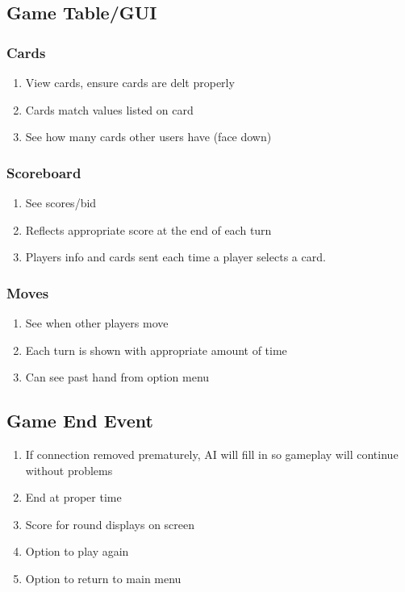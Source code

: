 \documentclass[11pt, titlepage]{article}
\begin{document}
	      	\subsection{Game Table/GUI}
	      	\subsubsection{Cards}
	      	\begin{enumerate}
	      		\item View  cards, ensure cards are delt properly
	      		\item Cards match values listed on card
	      		\item See how many cards other users have (face down)
	      	\end{enumerate}

	      	\subsubsection{Scoreboard}
	      	\begin{enumerate}
	      		\item See scores/bid
	      		\item Reflects appropriate score at the end of each turn
	      		\item Players info and cards sent each time a player selects a card.
	      	\end{enumerate}


	      	\subsubsection{Moves}

	      	\begin{enumerate}
	      		\item  See when other players move
	      		\item  Each turn is shown with appropriate amount of time
	      		\item  Can see past hand from option menu
	      	\end{enumerate}

	      	\subsection{Game End Event}
	      	\begin{enumerate}
	      		\item If connection removed prematurely, AI will fill in so gameplay will continue without problems
	      		\item End at proper time
	      		\item Score for round displays on screen
	      		\item Option to play again
	      		\item Option to return to main menu
	      	\end{enumerate}
\end{document}
